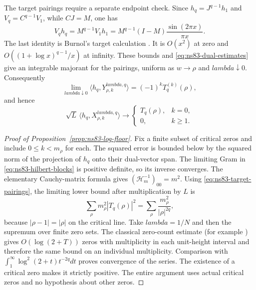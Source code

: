 \documentclass[11pt]{article}
\def\lambda{lambda}%
\theoremstyle{remark}
\begin{document}
The target pairings require a separate endpoint check. Since
$h_q=J^{q-1}h_1$ and $V_q=C^{q-1}V_1$, while $CJ=M$, one has
\[
 V_qh_q=M^{q-1}V_1h_1
       =M^{q-1}(I-M)\frac{\sin(2\pi x)}{\pi x}.
\]
The last identity is Burnol's target calculation
\cite[Theorem 5.4]{BurnolLower2002}. It is $O(x^2)$ at zero and
$O((1+\log x)^{q-1}/x)$ at infinity. These bounds and
\eqref{eq:ns83-dual-estimates} give an integrable majorant for the
pairings, uniform as $w\to\rho$ and $\lambda\downarrow0$.
Consequently
\[
 \lim_{\lambda\downarrow0}\langle h_q,Y^{\lambda,q}_{\rho,k}\rangle
       =(-1)^k T_q^{(k)}(\rho),
\]
and hence
\begin{equation}
 \sqrt L\,\langle h_q,X^{\lambda,q}_{\rho,k}\rangle
 \longrightarrow
 \begin{cases}T_q(\rho),&k=0,\\0,&k\geq1.\end{cases}
 \label{eq:ns83-target-pairings}
\end{equation}

\begin{proof}[Proof of Proposition~\ref{prop:ns83-log-floor}]
Fix a finite subset of critical zeros and include $0\leq k<m_\rho$
for each. The squared error is bounded below by the squared norm of the
projection of $h_q$ onto their dual-vector span. The limiting Gram in
\eqref{eq:ns83-hilbert-blocks} is positive definite, so its inverse
converges. The elementary Cauchy-matrix formula gives
$(\mathcal H_m^{-1})_{00}=m^2$. Using
\eqref{eq:ns83-target-pairings}, the limiting lower bound after
multiplication by $L$ is
\[
 \sum_\rho m_\rho^2|T_q(\rho)|^2
 =\sum_\rho\frac{m_\rho^2}{|\rho|^{2q}},
\]
because $|\rho-1|=|\rho|$ on the critical line.
Take $\lambda=1/N$ and then the supremum over finite zero sets.
The classical zero-count estimate (for example \cite{HasanalizadeShenWong2022}) gives $O(\log(2+T))$ zeros with
multiplicity in each unit-height interval and therefore the same bound
on an individual multiplicity. Comparison with
$\int_1^\infty \log^2(2+t)t^{-2q}dt$ proves convergence of the series.
The existence of a critical zero makes it strictly positive. The entire
argument uses actual critical zeros and no hypothesis about other zeros.
\end{proof}
\end{document}

